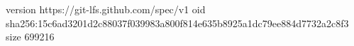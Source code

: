 version https://git-lfs.github.com/spec/v1
oid sha256:15c6ad3201d2c88037f039983a800f814e635b8925a1dc79ee884d7732a2c8f3
size 699216

